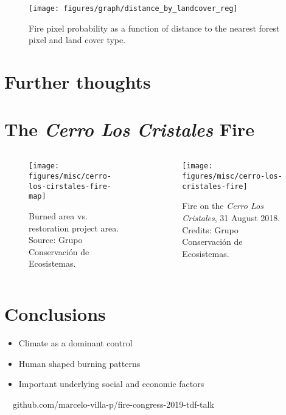 \documentclass[10pt]{beamer}
\begin{document}
\begin{frame}{}
    \begin{figure}
        \centering
        \texttt{[image: figures/graph/distance\_by\_landcover\_reg]}
        \caption{Fire pixel probability as a function of distance to the nearest forest pixel and land cover type.}
    \end{figure}
\end{frame}

\section{Further thoughts}

\section{The \emph{Cerro Los Cristales} Fire}

\begin{frame}{}
    \begin{columns}[onlytextwidth]
        \begin{column}{0.5\textwidth}
            \begin{figure}
                \centering
                \texttt{[image: figures/misc/cerro-los-cirstales-fire-map]}
                \caption{Burned area vs. restoration project area. Source: Grupo Conservación de Ecosistemas.}
            \end{figure}
        \end{column}
         \begin{column}{0.5\textwidth}
            \begin{figure}
                \centering
                 \texttt{[image: figures/misc/cerro-los-cristales-fire]}
                \caption{Fire on the \emph{Cerro Los Cristales}, 31 August 2018. Credits: Grupo Conservación de Ecosistemas.}
            \end{figure}
        \end{column}
    \end{columns}
\end{frame}

\section{Conclusions}

\begin{frame}{}
    \begin{itemize}[<+->]
        \item \alert{Climate} as a dominant control
        \item \alert{Human shaped} burning patterns
        \item Important underlying \alert{social} and \alert{economic} factors
    \end{itemize}
\end{frame}

\begin{frame}{}
    \centering
    \faGithub~~github.com/\alert{marcelo-villa-p}/fire-congress-2019-tdf-talk
\end{frame}


\appendix

\begin{frame}[allowframebreaks]{}
    \renewcommand*{\bibfont}{\tiny}
    \printbibliography[heading=none]
%   

\end{frame}
\end{document}
